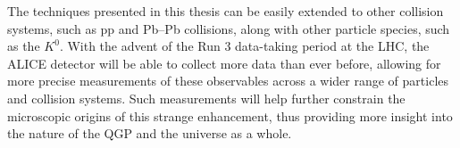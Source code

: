The techniques presented in this thesis can be easily extended to other collision systems, such as pp and Pb--Pb collisions, along with other particle species, such as the $K^0$. With the advent of the Run 3 data-taking period at the LHC, the ALICE detector will be able to collect more data than ever before, allowing for more precise measurements of these observables across a wider range of particles and collision systems. Such measurements will help further constrain the microscopic origins of this strange enhancement, thus providing more insight into the nature of the QGP and the universe as a whole.